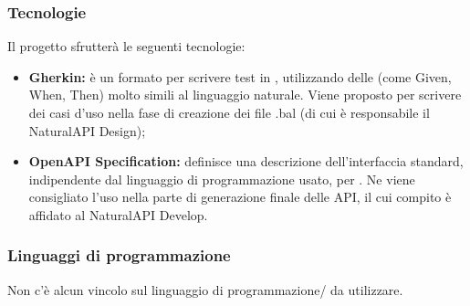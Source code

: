     \subsubsection{Tecnologie}
     	Il progetto sfrutterà le seguenti tecnologie:
     	\begin{itemize}
     		\item \textbf{Gherkin: }è un formato per scrivere test in , utilizzando delle  (come Given, When, Then) molto simili al linguaggio naturale. Viene proposto per scrivere dei casi d'uso nella fase di creazione dei file .bal (di cui è responsabile il NaturalAPI Design);
     		\item \textbf{OpenAPI Specification: }definisce una descrizione dell'interfaccia standard, indipendente dal linguaggio di programmazione usato, per . Ne viene consigliato l'uso nella parte di generazione finale delle API, il cui compito è affidato al NaturalAPI Develop.
     	\end{itemize}
        \subsubsection{Linguaggi di programmazione}
        Non c'è alcun vincolo sul linguaggio di programmazione/ da utilizzare.

